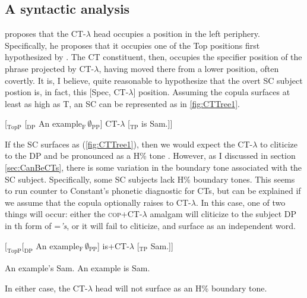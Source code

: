 \documentclass[
	letterpaper,
]{article}
\begin{document}
\subsection{A syntactic analysis}\label{sec:syntax}
\textcite[124]{constant2014diss} proposes that the CT-$\lambda$ head occupies a position in the left periphery.
Specifically, he proposes that it occupies one of the Top positions first hypothesized by \textcite{rizzi1997fine}.
The CT constituent, then, occupies the specifier position of the phrase projected by CT-$\lambda$, having moved there from a lower position, often covertly.
It is, I believe, quite reasonable to hypothesize that the overt SC subject postion is, in fact, this [Spec, CT-$\lambda$] position.
Assuming the copula surfaces at least as high as T, an SC can be represented as in \ref{fig:CTTree1}.
\begin{exe}
\ex\label{fig:CTTree1} [$_\text{TopP}$ [$_\text{DP}$ An example$_\text{F}\,\emptyset_\text{PP}$] CT-$\lambda$ [$_\text{TP}$ is Sam.]]	
\end{exe}
If the SC surfaces as (\ref{fig:CTTree1}), then we would expect the CT-$\lambda$ to cliticize to the DP and be pronounced as a H\% tone \parencite[following][]{constant2014diss}.
However, as I discussed in section \ref{sec:CanBeCTs}, there is some variation in the boundary tone associated with the SC subject.
Specifically, some SC subjects lack H\% boundary tones.
This seems to run counter to Constant's phonetic diagnostic for CTs, but can be explained if we assume that the copula optionally raises to CT-$\lambda$.
In this case, one of two things will occur: either the \textsc{cop}+CT-$\lambda$ amalgam will cliticize to the subject DP in th form of =\textit{'s}, or it will fail to cliticize, and surface as an independent word.
\begin{exe}
\ex $[_\text{TopP} [_\text{DP}$ An example$_\text{F}\,\emptyset_\text{PP}$] is+CT-$\lambda$ [$_\text{TP}$ Sam.]]
	\begin{xlist}
		\ex An example's Sam.
		\ex An example is Sam.
	\end{xlist}	
\end{exe}
In either case, the CT-$\lambda$ head will not surface as an H\% boundary tone.
\end{document}
